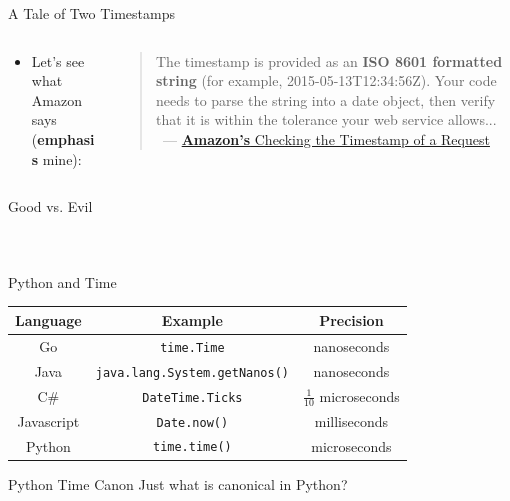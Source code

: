 \documentclass[10pt]{beamer}
\begin{document}
\begin{frame}{A Tale of Two Timestamps}
\begin{columns}
	\begin{column}{0.5 \textwidth}
		\begin{itemize}
			\item Let's see what Amazon says (\textbf{emphasis} mine):
		\end{itemize}
	\end{column}
	\begin{column}{0.5 \textwidth}
		\begin{quote}
			The timestamp is provided as an \textbf{ISO 8601 formatted string} (for example, 2015-05-13T12:34:56Z). Your code needs to parse the string into a date object, then verify that it is within the tolerance your web service allows...
\\\
		--- \href{https://developer.amazon.com/public/solutions/alexa/alexa-skills-kit/docs/developing-an-alexa-skill-as-a-web-service\#timestamp}{\textbf{Amazon's} Checking the Timestamp of a Request}
		\end{quote}
	\end{column}
\end{columns}
\end{frame}

\begin{frame}{Good vs. Evil}
\begin{columns}
	\begin{column}{0.5 \textwidth}
		\inputminted[fontsize=\small,frame=single,framesep=2mm,linenos=true,breaklines]{javascript}{src/good.json}
	\end{column}
	\begin{column}{0.5 \textwidth}
		\inputminted[fontsize=\small,frame=single,framesep=2mm,linenos=true,breaklines]{javascript}{src/bad.json}
	\end{column}
\end{columns}
\end{frame}

\renewcommand{\arraystretch}{1.5}
\begin{frame}{Python and Time}
\begin{center}
\begin{tabular}{ c c c }
Language & Example & Precision \\
\hline
Go & \texttt{time.Time} & nanoseconds \\
Java & \texttt{java.lang.System.getNanos()} & nanoseconds \\
C\# & \texttt{DateTime.Ticks} & \(\frac{1}{10}\) microseconds \\
Javascript & \texttt{Date.now()} & milliseconds \\
Python & \texttt{time.time()} & microseconds
\end{tabular}
\end{center}
\end{frame}

\begin{frame}{Python Time Canon}
Just what is canonical in Python?

\end{frame}
\end{document}
